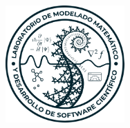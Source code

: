 \newcommand{\titulo}[1]{\def\eltitulo{#1}}
\newcommand{\carrera}[1]{\def\lacarrera{#1}}
\newcommand{\nombre}[1]{\def\elnombre{#1}}    %
\newcommand{\director}[1]{\def\eldirector{#1}}  %
\newcommand{\asesor}[1]{\def\asesor{#1}}  %
\newcommand{\grado}[1]{\def\grado{#1}}  %
\newcommand{\fecha}[1]{\def\lafecha{#1}}

\titulo{\sc{\Large La dimensi\'{o}n fractal como medida caracterizadora de la estructura de las prote\'{i}nas}}
\nombre{{Quím. Édgar García Juárez}}
\carrera{}
\grado{Maestro en Ciencias Qu\'{i}micas}
\director{{Dr. Juan Manuel Solano Altamirano}}
\asesor{{Dra. Viridiana Vargas Castro}}
\fecha{\today}


\thispagestyle{empty}


	\begin{minipage}[c][-.6cm][s]{29.9cm}
		\begin{center}
			\includegraphics[height=4.5cm]{graphs/LMMDSSblue.pdf}
		\end{center}
	\end{minipage}

